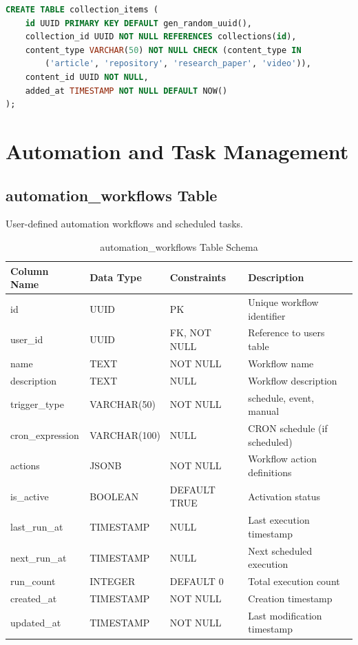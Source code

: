 \documentclass[12pt,a4paper]{report}
\begin{document}
\begin{lstlisting}[language=SQL,basicstyle=\ttfamily\small]
CREATE TABLE collection_items (
    id UUID PRIMARY KEY DEFAULT gen_random_uuid(),
    collection_id UUID NOT NULL REFERENCES collections(id),
    content_type VARCHAR(50) NOT NULL CHECK (content_type IN 
        ('article', 'repository', 'research_paper', 'video')),
    content_id UUID NOT NULL,
    added_at TIMESTAMP NOT NULL DEFAULT NOW()
);
\end{lstlisting}

\newpage

\chapter{Automation and Task Management}

\section{automation\_workflows Table}

User-defined automation workflows and scheduled tasks.

\begin{table}[h]
\centering
\small
\caption{automation\_workflows Table Schema}
\begin{tabular}{|l|l|l|l|}
\toprule
\textbf{Column Name} & \textbf{Data Type} & \textbf{Constraints} & \textbf{Description} \\
\midrule
id & UUID & PK & Unique workflow identifier \\
user\_id & UUID & FK, NOT NULL & Reference to users table \\
name & TEXT & NOT NULL & Workflow name \\
description & TEXT & NULL & Workflow description \\
trigger\_type & VARCHAR(50) & NOT NULL & schedule, event, manual \\
cron\_expression & VARCHAR(100) & NULL & CRON schedule (if scheduled) \\
actions & JSONB & NOT NULL & Workflow action definitions \\
is\_active & BOOLEAN & DEFAULT TRUE & Activation status \\
last\_run\_at & TIMESTAMP & NULL & Last execution timestamp \\
next\_run\_at & TIMESTAMP & NULL & Next scheduled execution \\
run\_count & INTEGER & DEFAULT 0 & Total execution count \\
created\_at & TIMESTAMP & NOT NULL & Creation timestamp \\
updated\_at & TIMESTAMP & NOT NULL & Last modification timestamp \\
\bottomrule
\end{tabular}
\end{table}
\end{document}
